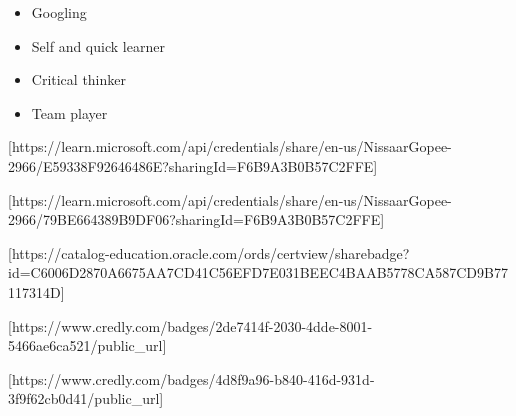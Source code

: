 \documentclass[10pt,a4paper,ragged2e,withhyper]{altacv}
\begin{document}
\begin{paracol}{2}

\begin{multicols}{2}
\begin{itemize}[label=\textcolor{DarkPastelRed}{$\triangleright$}]
\item Googling
\item Self and quick learner
\item Critical thinker
\item Team player 
\end{itemize}
\end{multicols}

\newpage



[https://learn.microsoft.com/api/credentials/share/en-us/NissaarGopee-2966/E59338F92646486E?sharingId=F6B9A3B0B57C2FFE]

\divider


[https://learn.microsoft.com/api/credentials/share/en-us/NissaarGopee-2966/79BE664389B9DF06?sharingId=F6B9A3B0B57C2FFE]

\divider


[https://catalog-education.oracle.com/ords/certview/sharebadge?id=C6006D2870A6675AA7CD41C56EFD7E031BEEC4BAAB5778CA587CD9B77117314D]

\divider


[https://www.credly.com/badges/2de7414f-2030-4dde-8001-5466ae6ca521/public_url]

\divider


[https://www.credly.com/badges/4d8f9a96-b840-416d-931d-3f9f62cb0d41/public_url]

\divider


\end{paracol}
\end{document}
